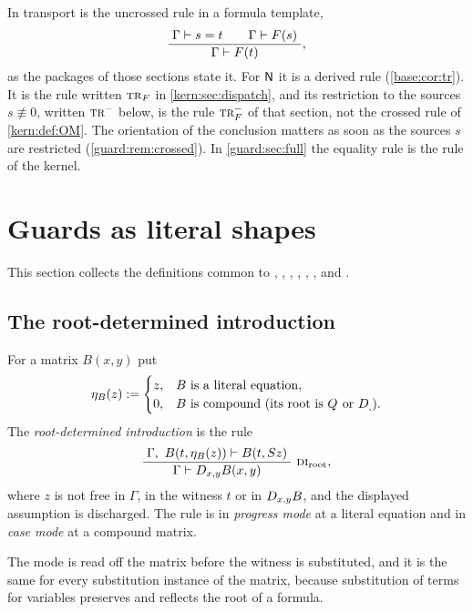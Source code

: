 In  transport is the
uncrossed rule in a formula template,
\[
 \dfrac{\;\Gamma\vdash s=t\qquad\Gamma\vdash F(s)\;}{\;\Gamma\vdash F(t)\;},
\]
as the packages of those sections state it.  For $\mathsf{N}$ it is a derived
rule (\cref{base:cor:tr}).  It is the rule written $\rulename{Tr}_F$ in
\cref{kern:sec:dispatch}, and its restriction to the sources
$s\not\equiv 0$, written $\rulename{Tr}^{-}$ below, is the rule
$\rulename{Tr}_F^{-}$ of that section, not the crossed rule of
\cref{kern:def:OM}.  The orientation of the
conclusion matters as soon as the sources $s$ are restricted
(\cref{guard:rem:crossed}).  In \cref{guard:sec:full} the equality rule is
the rule  of the kernel.

\section{Guards as literal shapes}
\label{guard:sec:shapes}

This section collects the definitions common to ,
, ,
, , ,
 and .

\subsection{The root-determined introduction}

\begin{definition}
\label{guard:def:root}
For a matrix $B(x,y)$ put
\[
 \eta_B(z)\mathrel{:=}
 \begin{cases}
  z, & B \text{ is a literal equation},\\
  0, & B \text{ is compound (its root is } Q_{} \text{ or } D_{,}).
 \end{cases}
\]
The \emph{root-determined introduction} is the rule
\[
 \infrule{\Gamma,\ B(t,\eta_B(z))\proves B(t,\Suc z)}
         {\Gamma\proves\D{x}{y}B(x,y)}\ \rulename{DI}_{\mathrm{root}},
\]
where $z$ is not free in $\Gamma$, in the witness $t$ or in $D_{x,y}B$, and
the displayed assumption is discharged.  The rule is in \emph{progress
mode} at a literal equation and in \emph{case mode} at a compound matrix.
\end{definition}

The mode is read off the matrix before the witness is substituted, and it is
the same for every substitution instance of the matrix, because substitution
of terms for variables preserves and reflects the root of a formula.

